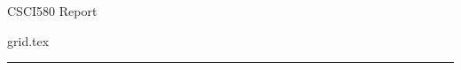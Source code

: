 \documentclass[12pt,twocolumn]{extarticle}
\begin{document}
CSCI580 Report

{grid.tex}
\hrule
\end{document}
